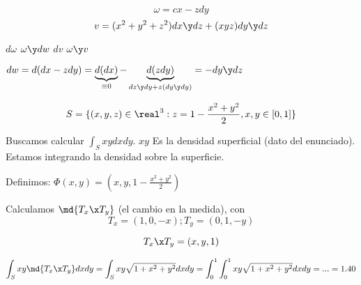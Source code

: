 \begin{problem}[2]

\[\omega = cx - zdy\]
\[v= (x^2+y^2+z^2)dx\y dz + (xyz)dy\y dz\]

\ppart $d\omega$
\ppart $\omega \y dw$
\ppart $dv$
\ppart $\omega \y v$

\solution

\spart $dw = d(dx-zdy) = \underbrace{d(dx)}_{\equiv 0} - \underbrace{d(zdy)}_{dz\y dy + z(dy\y dy)} = -dy\y dz$ 

\spart 

\spart 

\spart 


\end{problem}

\begin{problem}[13]
\[S=\{(x,y,z)\in\real^3: z=1-\frac{x^2+y^2}{2},x,y\in[0,1]\}\]

\solution

Buscamos calcular $\int_S xydxdy$. $xy$ Es la densidad superficial (dato del enunciado). Estamos integrando la densidad sobre la superficie.

Definimos: $\Phi(x,y) = \left(x,y,1-\frac{x^2+y^2}{2}\right)$

Calculamos $\md{T_x\x T_y}$ (el cambio en la medida), con
\[T_x = (1,0,-x);T_y=(0,1,-y)\]

\[T_x\x T_y = (x,y,1)\]

\[\int_S xy \md{T_x\x T_y} dxdy = \int_S xy\sqrt{1+x^2+y^2}dxdy = \int_0^1\int_0^1 xy\sqrt{1+x^2+y^2} dxdy = ... = 1.40\]

\end{problem}

